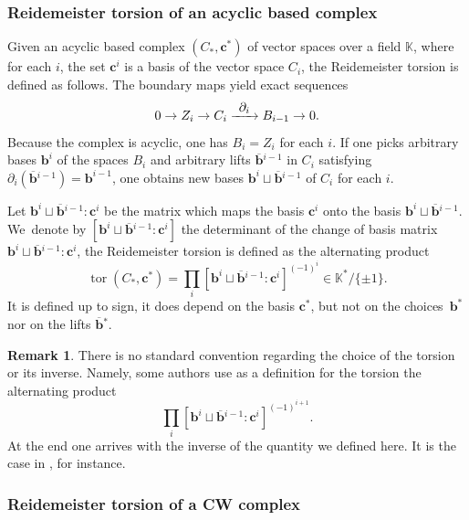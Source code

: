\documentclass[JEP,XML,SOM,Unicode,NoFloatCountersInSection,published]{cedram}
\newcommand\To[1]{\mathchoice{\xrightarrow{\textstyle\kern4pt#1\kern3pt}}{\stackrel{#1}{\longrightarrow}}{}{}}
\theoremstyle{plain}
\theoremstyle{definition}
\newtheorem{rmrk}[thm]{Remark}
\theoremstyle{remark}
\newcommand{\K}{\mathbb{K}}
\numberwithin{equation}{section}
\DeclareMathOperator{\tor}{tor}
\begin{document}
\subsubsection{Reidemeister torsion of an acyclic based complex}

Given an acyclic based complex $(C_*, \boldsymbol{c}^*)$ of vector spaces over a field $\K$, where for each $i$, the set $\boldsymbol{c}^i$ is a basis of the vector space $C_i$, the Reidemeister torsion is defined as follows.
The boundary maps yield exact sequences
\[
0 \to Z_i \to C_i \To{\partial_i} B_{i-1} \to 0.
\]
Because the complex is acyclic, one has $B_i = Z_i$ for each $i$. If one picks arbitrary bases $\boldsymbol{b}^i$ of the spaces $B_i$ and arbitrary lifts $\boldsymbol{\overline b}{}^{i-1}$ in $C_{i}$ satisfying $\partial_i(\boldsymbol{\overline b}{}^{i-1}) =\boldsymbol{b}^{i-1}$, one obtains new bases $\boldsymbol{b}^i \sqcup \boldsymbol{\overline b}{}^{i-1}$ of $C_i$ for each $i$.

Let $\boldsymbol{b}^i \sqcup \boldsymbol{\overline b}{}^{i-1} \colon \boldsymbol{c}^i$ be the matrix which maps the basis $\boldsymbol c^i$ onto the basis $\boldsymbol{b}^i \sqcup \boldsymbol{\overline b}{}^{i-1}$.
We~denote by $[\boldsymbol{b}^i \sqcup \boldsymbol{\overline b}{}^{i-1} \colon \boldsymbol{c}^i]$ the determinant of the change of basis matrix $\boldsymbol{b}^i \sqcup \boldsymbol{\overline b}{}^{i-1} \colon \boldsymbol{c}^i$, the Reidemeister torsion is defined as the alternating product
\[
\tor(C_*, \boldsymbol{c}^*) = \prod_i [\boldsymbol{b}^i \sqcup \boldsymbol{\overline b}{}^{i-1} \colon \boldsymbol{c}^i]^{(-1)^i} \in \K^* / \{\pm 1\}.
\]
It is defined up to sign, it does depend on the basis $\boldsymbol{c}^*$, but not on the choices~$\boldsymbol{b}^*$ nor on the lifts $\boldsymbol{\overline b}{}^*$.

\begin{rmrk}
\label{rmk:convention}
There is no standard convention regarding the choice of the torsion or its inverse. Namely, some authors use as a definition for the torsion the alternating product
\[
\prod_i [\boldsymbol{b}^i \sqcup \boldsymbol{\overline b}{}^{i-1} \colon \boldsymbol{c}^i]^{(-1)^{i+1}}.
\]
At the end one arrives with the inverse of the quantity we defined here. It is the case in \cite{fried1986fuchsian}, for instance.
\end{rmrk}
\subsubsection{Reidemeister torsion of a CW complex}
\end{document}
